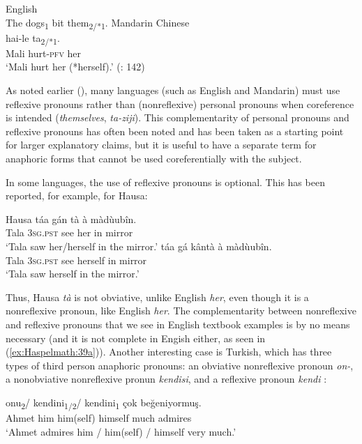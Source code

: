 \documentclass[output=paper]{langscibook}
\begin{document}
\ea%
    \label{ex:Haspelmath:46}
    \ea English\\
     {The} {dogs\textsubscript{1}} {bit} {them\textsubscript{2/*1}}.
    \ex Mandarin Chinese\\
      {hai-le}  {ta\textsubscript{2/*1}}.\\
      Mali  hurt-\textsc{pfv}  her\\
    \glt‘Mali hurt her (*herself).’ (\citealt{Cole2015}: 142)
    \z
\z   

     

As noted earlier (), many languages (such as English and Mandarin) must use reflexive pronouns rather than (nonreflexive) personal pronouns when coreference is intended (\textit{themselves}, \textit{ta-ziji}). This complementarity of personal pronouns and reflexive pronouns has often been noted and has been taken as a starting point for larger explanatory claims, but it is useful to have a separate term for anaphoric forms that cannot be used coreferentially with the subject.

In some languages, the use of reflexive pronouns is optional. This has been reported, for example, for Hausa:

\ea%
    Hausa \citep[524]{Newman2000} \label{ex:Haspelmath:47}
    \ea  \label{ex:Haspelmath:47a}
      {táa}  {gán}  {tà}  {à}  {màdùubîn.}\\
         Tala  \textsc{3sg.pst}  see  her  in  mirror \\
    \glt ‘Tala saw her/herself in the mirror.’
    \ex 
      {táa}  {gá}  {kântà}  {à}  {màdùubîn.}\\
     Tala  \textsc{3sg.pst}  see  herself  in  mirror\\
     \glt ‘Tala saw herself in the mirror.’
    \z
\z 

Thus, Hausa \textit{tà} is not obviative, unlike English \textit{her}, even though it is a nonreflexive pronoun, like English \textit{her}. The complementarity between nonreflexive and reflexive pronouns that we see in English textbook examples is by no means necessary (and it is not complete in Engish either, as seen in (\ref{ex:Haspelmath:39a})). Another interesting case is Turkish, which has three types of third person anaphoric pronouns: an obviative nonreflexive pronoun \textit{on-}, a nonobviative nonreflexive pronun \textit{kendisi}, and a reflexive pronoun \textit{kendi} \citep{Kornfilt2001}:

\ea%
    \label{ex:Haspelmath:48}
      {onu\textsubscript{2}/} {kendini\textsubscript{1/2}/} {kendini\textsubscript{1}}  {çok}  {beğeniyormuş.}\\
      Ahmet  him      him(self)    himself  much  admires  \\
    \glt‘Ahmet admires him / him(self) / himself very much.’ \citep[200]{Kornfilt2001}
\z
\end{document}
